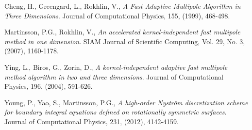 \documentclass[12pt,letterpaper]{article}
\begin{document}
\begin{thebibliography}{99}

 Cheng, H., Greengard, L., Rokhlin, V., \emph{A Fast Adaptive Multipole Algorithm in Three Dimensions}. Journal of Computational Physics, 155, (1999), 468-498.


 Martinsson, P.G., Rokhlin, V., \emph{An accelerated kernel-independent fast multipole method in one dimension}. SIAM Journal of Scientific Computing, Vol. 29, No. 3, (2007), 1160-1178.

 Ying, L., Biros, G., Zorin, D., \emph{A kernel-independent adaptive fast multipole method algorithm in two and three dimensions}. Journal of Computational Physics, 196, (2004), 591-626.

 Young, P., Yao, S., Martinsson, P.G., \emph{A high-order Nystr{\"o}m discretization scheme for boundary integral equations defined on rotationally symmetric surfaces}. Journal of Computational Physics, 231, (2012), 4142-4159.

\end{thebibliography}
\end{document}
